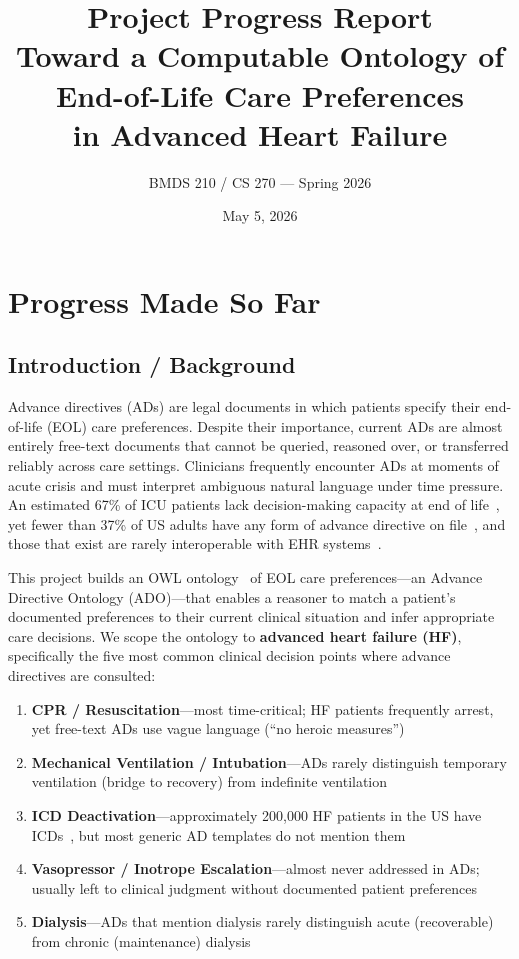 \documentclass[11pt]{article}
\title{Project Progress Report\\[0.3em]
\large Toward a Computable Ontology of End-of-Life Care Preferences\\in Advanced Heart Failure}
\author{BMDS 210 / CS 270 --- Spring 2026}
\date{May 5, 2026}
\begin{document}
\maketitle

\section{Progress Made So Far}

\subsection{Introduction / Background}

Advance directives (ADs) are legal documents in which patients specify their end-of-life (EOL) care preferences. Despite their importance, current ADs are almost entirely free-text documents that cannot be queried, reasoned over, or transferred reliably across care settings. Clinicians frequently encounter ADs at moments of acute crisis and must interpret ambiguous natural language under time pressure. An estimated 67\% of ICU patients lack decision-making capacity at end of life~\cite{silveira2010}, yet fewer than 37\% of US adults have any form of advance directive on file~\cite{yadav2017}, and those that exist are rarely interoperable with EHR systems~\cite{hl7adi2024}.

This project builds an OWL ontology~\cite{owl2primer} of EOL care preferences---an Advance Directive Ontology (ADO)---that enables a reasoner to match a patient's documented preferences to their current clinical situation and infer appropriate care decisions. We scope the ontology to \textbf{advanced heart failure (HF)}, specifically the five most common clinical decision points where advance directives are consulted:

\begin{enumerate}[nosep]
    \item \textbf{CPR / Resuscitation}---most time-critical; HF patients frequently arrest, yet free-text ADs use vague language (``no heroic measures'')
    \item \textbf{Mechanical Ventilation / Intubation}---ADs rarely distinguish temporary ventilation (bridge to recovery) from indefinite ventilation
    \item \textbf{ICD Deactivation}---approximately 200,000 HF patients in the US have ICDs~\cite{kremers2023}, but most generic AD templates do not mention them
    \item \textbf{Vasopressor / Inotrope Escalation}---almost never addressed in ADs; usually left to clinical judgment without documented patient preferences
    \item \textbf{Dialysis}---ADs that mention dialysis rarely distinguish acute (recoverable) from chronic (maintenance) dialysis
\end{enumerate}
\end{document}
